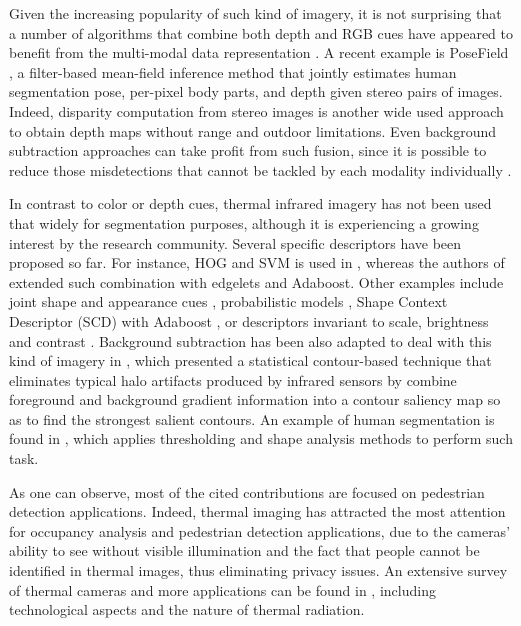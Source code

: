 \documentclass[10pt,twocolumn,letterpaper]{article}
\begin{document}
Given the increasing popularity of such kind of imagery, it is not surprising that a number of algorithms that combine both depth and RGB cues have appeared to benefit from the multi-modal data representation \cite{stefanczyk2012multimodal,  clapes2012user, sheasby2012simultaneous, hernandez2012bovdw, teichman2013learning, scharwachter2013efficient, sheasby2013robust, alahari2013pose}. A recent example is PoseField \cite{vineet2013posefield}, a filter-based mean-field inference method that jointly estimates human segmentation pose, per-pixel body parts, and depth given stereo pairs of images. Indeed, disparity computation from stereo images is another wide used approach to obtain depth maps without range and outdoor limitations. Even background subtraction approaches can take profit from such fusion, since it is possible to reduce those misdetections that cannot be tackled by each modality individually \cite{gordon1999background, camplani2014background}. 
 
 In contrast to color or depth cues, thermal infrared imagery has not been used that widely for segmentation purposes, although it is experiencing a growing interest by the research community. Several specific descriptors have been proposed so far. For instance, HOG and SVM is used in \cite{suard2006pedestrian}, whereas the authors of \cite{zhang2007pedestrian} extended such combination with edgelets and Adaboost. Other examples include joint shape and appearance cues \cite{dai2007pedestrian}, probabilistic models \cite{bertozzi2007pedestrian}, Shape Context Descriptor (SCD) with Adaboost \cite{wang2010improved}, or descriptors invariant to scale, brightness and contrast \cite{olmeda2012contrast}. Background subtraction has been also adapted to deal with this kind of imagery in \cite{davis2004robust}, which presented a statistical contour-based technique that eliminates typical halo artifacts produced by infrared sensors by combine foreground and background gradient information into a contour saliency map so as to find the strongest salient contours. An example of human segmentation is found in \cite{fernandez2011real}, which applies thresholding and shape analysis methods to perform such task.

As one can observe, most of the cited contributions are focused on pedestrian detection applications. Indeed, thermal imaging has attracted the most attention for occupancy analysis \cite{gade2013long} and pedestrian detection applications, due to the cameras' ability to see without visible illumination and the fact that people cannot be identified in thermal images, thus eliminating privacy issues. An extensive survey of thermal cameras and more applications can be found in \cite{gade2014thermal}, including technological aspects and the nature of thermal radiation. 
\end{document}
